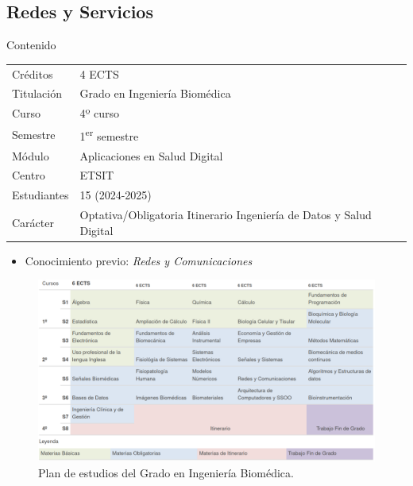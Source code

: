 \documentclass[xcolor=table,xcolor=x11names]{beamer}
\begin{document}
\subsection{Redes y Servicios}
\begin{frame}[allowframebreaks]{Contenido}
    \tableofcontents[currentsubsection]
\end{frame}
\begin{frame}{\subsecname}
    \begin{table}
        \begin{tabular}{ p{2cm} | p{7cm}}
            \toprule
            \rowcolor{upmblue!20}Créditos & 4 ECTS\\
            Titulación & Grado en Ingeniería Biomédica\\
            \rowcolor{upmblue!20}Curso & 4º curso\\
            Semestre & 1\textsuperscript{er} semestre\\
            \rowcolor{upmblue!20}Módulo &  Aplicaciones en Salud Digital\\
            Centro & ETSIT\\
            \rowcolor{upmblue!20}Estudiantes & 15 (2024-2025)\\
            Carácter & Optativa/Obligatoria \newline Itinerario Ingeniería de Datos y Salud Digital\\
            \bottomrule
        \end{tabular}
    \end{table}
\end{frame}




\begin{frame}{\subsecname}

\begin{itemize}
    \item Conocimiento previo: \emph{Redes y Comunicaciones}
\end{itemize}

\begin{figure}[t]
    \centering
    \includegraphics[width=.9\textwidth]{figures/gib-plan-estudios}
    \caption{Plan de estudios del Grado en Ingeniería Biomédica.}
    \label{fig:gib-plan-estudios}
\end{figure}

\end{frame}
\end{document}
